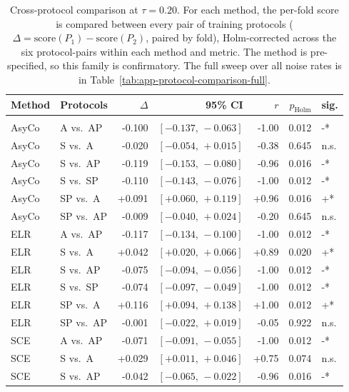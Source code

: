
\begin{table}[h!]
\centering
\caption{Cross-protocol comparison at $\tau=0.20$. For each method, the per-fold score is compared between every pair of training protocols ($\Delta=\text{score}(P_1)-\text{score}(P_2)$, paired by fold), Holm-corrected across the six protocol-pairs within each method and metric. The method is pre-specified, so this family is confirmatory. The full sweep over all noise rates is in Table~\ref{tab:app-protocol-comparison-full}.}
\label{tab:protocol-comparison-focus}
\begin{tabular}{llrrrrl}
\toprule
Method & Protocols & $\Delta$ & 95\% CI & $r$ & $p_{\mathrm{Holm}}$ & sig. \\
\midrule
\addlinespace
\multicolumn{7}{l}{\textit{Balanced accuracy}} \\
AsyCo & A vs.\ AP & -0.100 & $[-0.137,\,-0.063]$ & -1.00 & 0.012 & -* \\
AsyCo & S vs.\ A & -0.020 & $[-0.054,\,+0.015]$ & -0.38 & 0.645 & n.s. \\
AsyCo & S vs.\ AP & -0.119 & $[-0.153,\,-0.080]$ & -0.96 & 0.016 & -* \\
AsyCo & S vs.\ SP & -0.110 & $[-0.143,\,-0.076]$ & -1.00 & 0.012 & -* \\
AsyCo & SP vs.\ A & +0.091 & $[+0.060,\,+0.119]$ & +0.96 & 0.016 & +* \\
AsyCo & SP vs.\ AP & -0.009 & $[-0.040,\,+0.024]$ & -0.20 & 0.645 & n.s. \\
ELR & A vs.\ AP & -0.117 & $[-0.134,\,-0.100]$ & -1.00 & 0.012 & -* \\
ELR & S vs.\ A & +0.042 & $[+0.020,\,+0.066]$ & +0.89 & 0.020 & +* \\
ELR & S vs.\ AP & -0.075 & $[-0.094,\,-0.056]$ & -1.00 & 0.012 & -* \\
ELR & S vs.\ SP & -0.074 & $[-0.097,\,-0.049]$ & -1.00 & 0.012 & -* \\
ELR & SP vs.\ A & +0.116 & $[+0.094,\,+0.138]$ & +1.00 & 0.012 & +* \\
ELR & SP vs.\ AP & -0.001 & $[-0.022,\,+0.019]$ & -0.05 & 0.922 & n.s. \\
SCE & A vs.\ AP & -0.071 & $[-0.091,\,-0.055]$ & -1.00 & 0.012 & -* \\
SCE & S vs.\ A & +0.029 & $[+0.011,\,+0.046]$ & +0.75 & 0.074 & n.s. \\
SCE & S vs.\ AP & -0.042 & $[-0.065,\,-0.022]$ & -0.96 & 0.016 & -* \\

\end{tabular}
\end{table}
